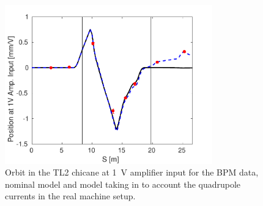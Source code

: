 \begin{figure}
  \centering
  \includegraphics[width=0.8\textwidth]{Figures/commissioning/orbClosureVsQuadModel}
  \caption{Orbit in the TL2 chicane at 1~V amplifier input for the BPM data, nominal model and model taking in to account the quadrupole currents in the real machine setup.}
  \label{f:orbClosureVsQuadModel}
\end{figure}


